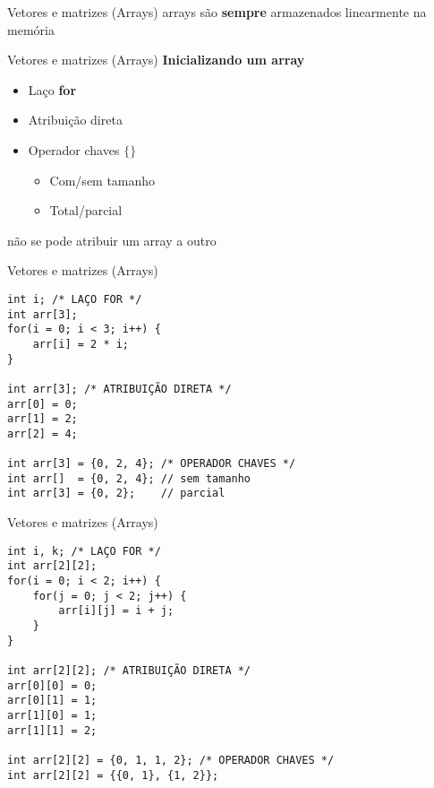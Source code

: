 \documentclass[10pt]{beamer}
\begin{document}
\begin{frame}{Vetores e matrizes (Arrays)}
    \huge
    arrays são \textbf{sempre} armazenados linearmente na memória
\end{frame}

\begin{frame}[fragile]{Vetores e matrizes (Arrays)}
    \huge
    \textbf{Inicializando um array}

    \begin{itemize}
        \item Laço \textbf{for}
        \item Atribuição direta
        \item Operador chaves $\{ \}$

        \begin{itemize}
            \Large
            \item Com/sem tamanho
            \item Total/parcial
        \end{itemize}
    \end{itemize}

    \Large

    não se pode atribuir um array a outro \faExclamationTriangle
\end{frame}

\begin{frame}[fragile]{Vetores e matrizes (Arrays)}
    \begin{verbatim}
int i; /* LAÇO FOR */
int arr[3];
for(i = 0; i < 3; i++) {
    arr[i] = 2 * i;
}

int arr[3]; /* ATRIBUIÇÃO DIRETA */
arr[0] = 0;
arr[1] = 2;
arr[2] = 4;

int arr[3] = {0, 2, 4}; /* OPERADOR CHAVES */
int arr[]  = {0, 2, 4}; // sem tamanho
int arr[3] = {0, 2};    // parcial
    \end{verbatim}
\end{frame}

\begin{frame}[fragile]{Vetores e matrizes (Arrays)}
    \begin{verbatim}
int i, k; /* LAÇO FOR */
int arr[2][2];
for(i = 0; i < 2; i++) {
    for(j = 0; j < 2; j++) {
        arr[i][j] = i + j;
    }
}

int arr[2][2]; /* ATRIBUIÇÃO DIRETA */
arr[0][0] = 0;
arr[0][1] = 1;
arr[1][0] = 1;
arr[1][1] = 2;

int arr[2][2] = {0, 1, 1, 2}; /* OPERADOR CHAVES */
int arr[2][2] = {{0, 1}, {1, 2}};
    \end{verbatim}
\end{frame}
\end{document}

